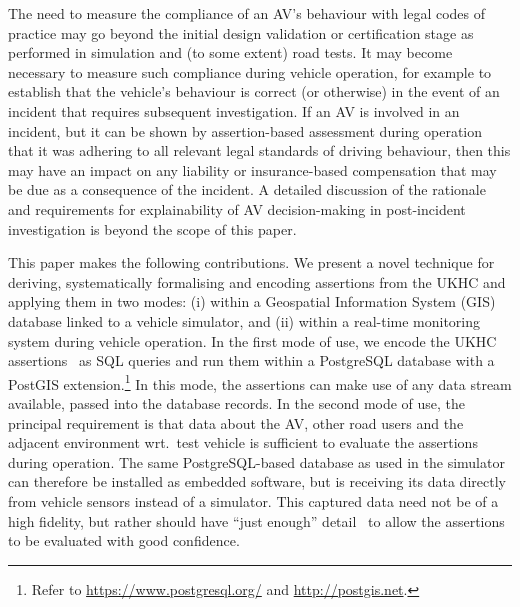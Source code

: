 The need to measure the compliance of an AV's behaviour with legal codes of practice may go beyond the initial design validation or certification stage as performed in simulation and (to some extent) road tests. It may become necessary to measure such compliance during vehicle operation, for example to establish that the vehicle's behaviour is correct (or otherwise) in the event of an incident that requires subsequent investigation. If an AV is involved in an incident, but it can be shown by assertion-based assessment during operation that it was adhering to all relevant legal standards of driving behaviour, then this may have an impact on any liability or insurance-based compensation that may be due as a consequence of the incident. A detailed discussion of the rationale and requirements for explainability of AV decision-making in post-incident investigation is beyond the scope of this paper.



This paper makes the following contributions. We present a novel technique for deriving, systematically formalising and encoding assertions from the UKHC and applying them in two modes: (i) within a Geospatial Information System (GIS) database linked to a vehicle simulator, and (ii) within a real-time monitoring system during vehicle operation.
%
In the first mode of use, we encode the UKHC assertions~\cite{highwayCode} as SQL queries and run them within a PostgreSQL database with a PostGIS extension.\footnote{Refer to  \url{https://www.postgresql.org/} and \url{http://postgis.net}.} In this mode, the assertions can make use of any data stream available, passed into the database records.
%
In the second mode of use, the principal requirement is that data about the AV, other road users and the adjacent environment wrt.\ test vehicle is sufficient to evaluate the assertions during operation. The same PostgreSQL-based database as used in the simulator can therefore be installed as embedded software, but is receiving its data directly from vehicle sensors instead of a simulator. This captured data need not be of a high fidelity, but rather should have ``just enough'' detail~\cite{Koopman2018} to allow the assertions to be evaluated with good confidence.





